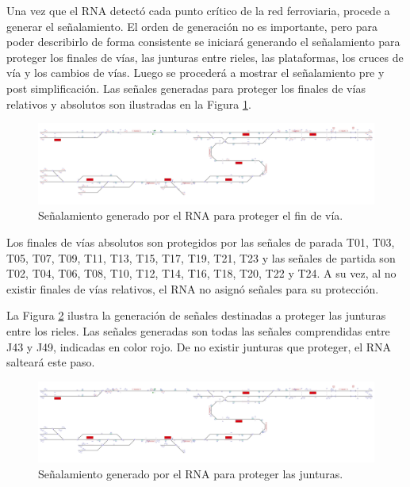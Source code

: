 	Una vez que el RNA detectó cada punto crítico de la red ferroviaria, procede a generar el señalamiento. El orden de generación no es importante, pero para poder describirlo de forma consistente se iniciará generando el señalamiento para proteger los finales de vías, las junturas entre rieles, las plataformas, los cruces de vía y los cambios de vías. Luego se procederá a mostrar el señalamiento pre y post simplificación. Las señales generadas para proteger los finales de vías relativos y absolutos son ilustradas en la Figura \ref{fig:EJ3_3}.
	
	\begin{figure}[H]
		\centering
		\includegraphics[width=1\textwidth]{resultados-obtenidos/ejemplo3/images/3_step1.png}
		\centering\caption{Señalamiento generado por el RNA para proteger el fin de vía.}
		\label{fig:EJ3_3}
	\end{figure}
	
	Los finales de vías absolutos son protegidos por las señales de parada T01, T03, T05, T07, T09, T11, T13, T15, T17, T19, T21, T23 y las señales de partida son T02, T04, T06, T08, T10, T12, T14, T16, T18, T20, T22 y T24. A su vez, al no existir finales de vías relativos, el RNA no asignó señales para su protección.
	
	La Figura \ref{fig:EJ3_4} ilustra la generación de señales destinadas a proteger las junturas entre los rieles. Las señales generadas son todas las señales comprendidas entre J43 y J49, indicadas en color rojo. De no existir junturas que proteger, el RNA salteará este paso.
	
	\begin{figure}[H]
		\centering
		\includegraphics[width=1\textwidth]{resultados-obtenidos/ejemplo3/images/3_step2.png}
		\centering\caption{Señalamiento generado por el RNA para proteger las junturas.}
		\label{fig:EJ3_4}
	\end{figure}
	
